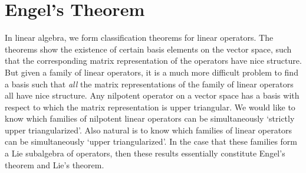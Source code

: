 \section{Engel's Theorem}

In linear algebra, we form classification theorems for linear operators. The theorems show the existence of certain basis elements on the vector space, such that the corresponding matrix representation of the operators have nice structure. But given a family of linear operators, it is a much more difficult problem to find a basis such that {\it all} the matrix representations of the family of linear operators all have nice structure. Any nilpotent operator on a vector space has a basis with respect to which the matrix representation is upper triangular. We would like to know which families of nilpotent linear operators can be simultaneously `strictly upper triangularized'. Also natural is to know which families of linear operators can be simultaneously `upper triangularized'. In the case that these families form a Lie subalgebra of operators, then these results essentially constitute Engel's theorem and Lie's theorem.

